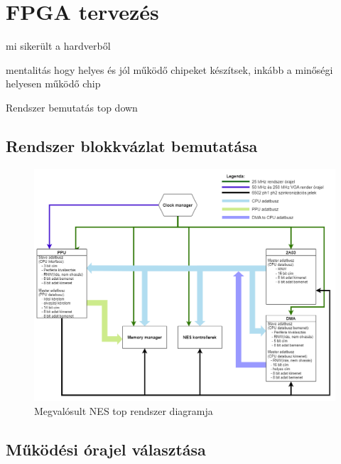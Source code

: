 \chapter{FPGA tervezés}

mi sikerült a hardverből

mentalitás hogy helyes és jól működő chipeket készítsek, inkább a minőségi helyesen működő chip

Rendszer bemutatás top down

\section{Rendszer blokkvázlat bemutatása}

\begin{figure}[H]
	\centering
	\includegraphics[width=150mm, keepaspectratio]{figures/FPGA-toplevel-diagram}
	\caption{Megvalósult NES top rendszer diagramja} 
	\label{fig:FPGA-toplevel-diagram}
\end{figure}

\section{Működési órajel választása}

